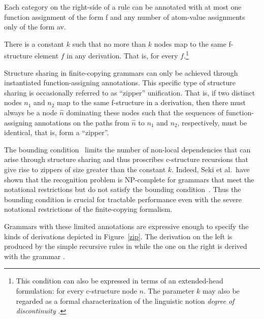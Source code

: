 \documentclass[output=paper,hidelinks]{langscibook}
\begin{document}
\ea\label{finitecopying}
\ea \label{Seki-notation} Each category on the right-side of a rule can be annotated with at most one function assignment of the form \assign f and any number of atom-value assignments only of the form \uval av.

\ex \label{Seki-bound} There is a constant $k$ such that no more than $k$ nodes map to the same f-structure element $f$ in any derivation.  That is,  for every $f$.\footnote{This condition can also be expressed in terms of an extended-head formulation:  for every  c-structure node $n$. The parameter $k$ may also be regarded as a formal characterization of the linguistic notion \textit{degree of discontinuity} \citep{Chomsky1953}.}
\z
\z

\noindent Structure sharing in finite-copying grammars can only be achieved through instantiated function-assigning annotations. This specific type of structure sharing is occasionally referred to as ``zipper'' unification. That is, if two distinct nodes $n_1$ and $n_2$  map to the same f-structure in a derivation, then there must always be a node \mbox{$\hat{n}$} dominating these nodes such that the sequences of function-assigning annotations on the paths from \mbox{$\hat{n}$} to  $n_1$ and  $n_2$, respectively, must be identical, that is, form a ``zipper''. 

The bounding condition~  limits the number of non-local dependencies that can arise through structure sharing and thus proscribes c-structure recursions that give rise to zippers of size greater than the constant $k$. Indeed, Seki et al.\ have shown that the recognition problem is \textsf{NP}-complete for grammars that meet the notational restrictions  but do not satisfy the bounding condition~. Thus the bounding condition is crucial for tractable performance even with the severe notational restrictions of the finite-copying formalism. 

 Grammars with these limited annotations are expressive enough to specify the kinds of derivations depicted in Figure~\ref{zip}. The derivation on the left is produced by the simple recursive rules in  while the one on the right is derived with the grammar .
\end{document}
